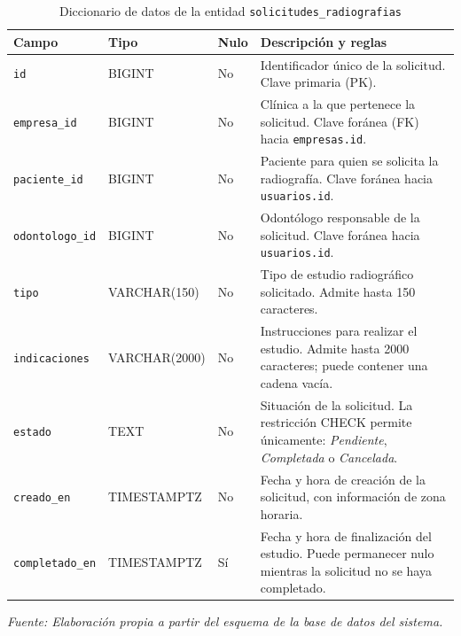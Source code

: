 	\begin{table}[htbp]
		\centering
		\caption{Diccionario de datos de la entidad
			\texttt{solicitudes\_radiografias}}
		\label{tab:diccionario-solicitudes}
		
		\small
		\renewcommand{\arraystretch}{1.25}
		\setlength{\tabcolsep}{4pt}
		
		\begin{tabularx}{\textwidth}{
				>{\raggedright\arraybackslash}p{}
				>{\raggedright\arraybackslash}p{}
				>{\centering\arraybackslash}p{}
				>{\raggedright\arraybackslash}X
			}
			\toprule
			\textbf{Campo} &
			\textbf{Tipo} &
			\textbf{Nulo} &
			\textbf{Descripción y reglas} \\
			\midrule
			
			\texttt{id} &
			BIGINT &
			No &
			Identificador único de la solicitud.
			Clave primaria (PK). \\
			
			\texttt{empresa\_id} &
			BIGINT &
			No &
			Clínica a la que pertenece la solicitud.
			Clave foránea (FK) hacia \texttt{empresas.id}. \\
			
			\texttt{paciente\_id} &
			BIGINT &
			No &
			Paciente para quien se solicita la radiografía.
			Clave foránea hacia \texttt{usuarios.id}. \\
			
			\texttt{odontologo\_id} &
			BIGINT &
			No &
			Odontólogo responsable de la solicitud.
			Clave foránea hacia \texttt{usuarios.id}. \\
			
			\texttt{tipo} &
			VARCHAR(150) &
			No &
			Tipo de estudio radiográfico solicitado.
			Admite hasta 150 caracteres. \\
			
			\texttt{indicaciones} &
			VARCHAR(2000) &
			No &
			Instrucciones para realizar el estudio.
			Admite hasta 2000 caracteres; puede contener
			una cadena vacía. \\
			
			\texttt{estado} &
			TEXT &
			No &
			Situación de la solicitud. La restricción
			CHECK permite únicamente:
			\textit{Pendiente}, \textit{Completada}
			o \textit{Cancelada}. \\
			
			\texttt{creado\_en} &
			TIMESTAMPTZ &
			No &
			Fecha y hora de creación de la solicitud,
			con información de zona horaria. \\
			
			\texttt{completado\_en} &
			TIMESTAMPTZ &
			Sí &
			Fecha y hora de finalización del estudio.
			Puede permanecer nulo mientras la solicitud
			no se haya completado. \\
			
			\bottomrule
		\end{tabularx}
		
		\vspace{3pt}
		{\footnotesize\textit{Fuente: Elaboración propia
				a partir del esquema de la base de datos del sistema.}}
	\end{table}


